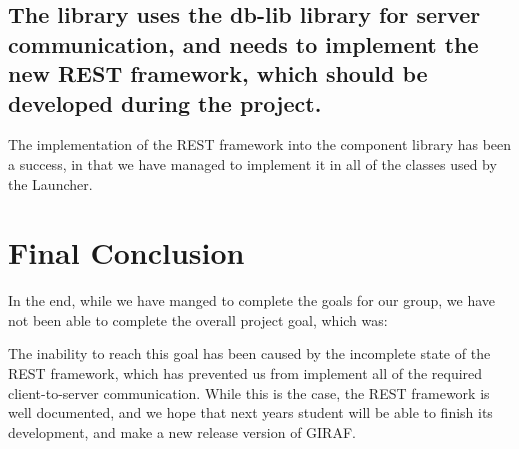 \subsection*{The library uses the db-lib library for server communication, and
needs to implement the new REST framework, which should be developed during the
project.}
The implementation of the REST framework into the component library has been a
success, in that we have managed to implement it in all of the classes used by
the Launcher.

\section{Final Conclusion}
In the end, while we have manged to complete the goals for our group, we have
not been able to complete the overall project goal, which was:\nl

\nl

The inability to reach this goal has been caused by the incomplete state of the
REST framework, which has prevented us from implement all of the required
client-to-server communication. While this is the case, the REST framework is
well documented, and we hope that next years student will be able to finish
its development, and make a new release version of GIRAF. 


